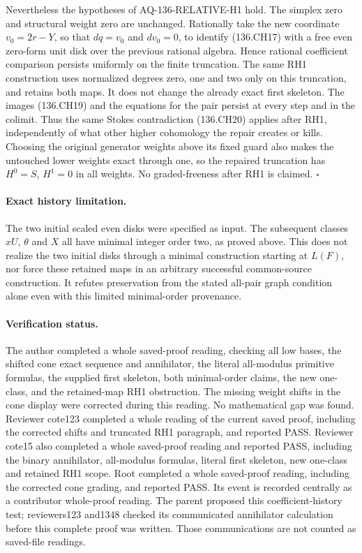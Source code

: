 Nevertheless the hypotheses of AQ-136-RELATIVE-H1 hold.
The simplex zero and structural weight zero are unchanged.
Rationally take the new coordinate $v_0=2r-Y$, so that
$dq=v_0$ and $dv_0=0$, to identify (136.CH17)
with a free even zero-form unit disk over the previous
rational algebra.  Hence rational coefficient comparison
persists uniformly on the finite truncation.  The same RH1
construction uses normalized degrees zero, one and two only
on this truncation, and retains both maps.  It
does not change the already exact first skeleton.  The
images (136.CH19) and the equations for the pair persist
at every step and in the colimit.  Thus the same Stokes
contradiction (136.CH20) applies after RH1, independently
of what other higher cohomology the repair creates or kills.
Choosing the original generator weights above its fixed
guard also makes the untouched lower weights exact through
one, so the repaired truncation has $H^0=S$, $H^1=0$ in
all weights.  No graded-freeness after RH1 is claimed.
\hfill$\square$

\paragraph{Exact history limitation.}
The two initial scaled even disks were specified as input.
The subsequent classes $xU$, $\theta$ and $X$ all have
minimal integer order two, as proved above.  This does
not realize the two initial disks through a minimal
construction starting at $L(F)$, nor force these retained
maps in an arbitrary successful common-source construction.
It refutes preservation from the stated all-pair graph
condition alone even with this limited minimal-order
provenance.

\paragraph{Verification status.}
The author completed a whole saved-proof reading, checking
all low bases, the shifted cone exact sequence and annihilator,
the literal all-modulus primitive formulas, the supplied first
skeleton, both minimal-order claims, the new one-class, and
the retained-map RH1 obstruction.  The missing weight shifts
in the cone display were corrected during this reading.  No
mathematical gap was found.  Reviewer cote123 completed a whole
reading of the current saved proof, including the corrected shifts
and truncated RH1 paragraph, and reported PASS.  Reviewer cote15
also completed a whole saved-proof reading and reported PASS,
including the binary annihilator, all-modulus formulas, literal
first skeleton, new one-class and retained RH1 scope.  Root
completed a whole saved-proof reading, including the corrected
cone grading, and reported PASS.  Its event is recorded centrally
as a contributor whole-proof reading.  The parent proposed this
coefficient-history test; reviewers123 and1348 checked its
communicated annihilator calculation before this complete
proof was written.  Those communications are not counted
as saved-file readings.
